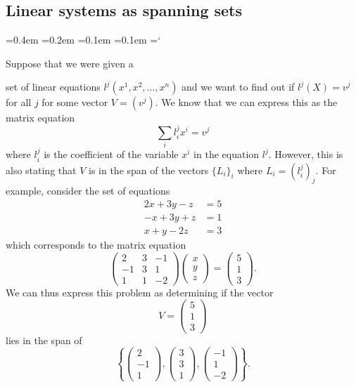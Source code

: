 
\subsection*{Linear systems as spanning sets}

{\ttfamily
{}\font=0.4em
\font=0.2em
\font=0.1em
\font=0.1em
\hyphenchar\font=`\-

\hypertarget{scripts_subspaces_and_spanning_sets_example}{Suppose that we were given a} set of linear equations $l^j(x^1, x^2, \dotsc, x^n)$ and we want to find out if $l^j(X) = v^j$ for all $j$ for some vector $V = (v^j)$. We know that we can express this as the matrix equation
\[
\sum_i l^j_i x^i = v^j
\]
where $l^j_i$ is the coefficient of the variable $x^i$ in the equation $l^j$. However, this is also stating that $V$ is in the span of the vectors $\{ L_i \}_i$ where $L_i = (l^j_i)_j$. For example, consider the set of equations
\begin{align*}
2 x + 3 y - z & = 5
\\ -x + 3y + z & = 1
\\ x + y - 2 z & = 3
\end{align*}
which corresponds to the matrix equation
\[
\begin{pmatrix}
2 & 3 & -1 \\
-1 & 3 & 1 \\
1 & 1 & -2
\end{pmatrix} \begin{pmatrix} x \\ y \\ z \end{pmatrix} = \begin{pmatrix} 5 \\ 1 \\ 3 \end{pmatrix}.
\]
We can thus express this problem as determining if the vector
\[
V = \begin{pmatrix} 5 \\ 1 \\ 3 \end{pmatrix}
\]
lies in the span of
\[
\left\{ \begin{pmatrix} 2 \\ -1 \\ 1 \end{pmatrix}, \begin{pmatrix} 3 \\ 3 \\ 1 \end{pmatrix}, \begin{pmatrix} -1 \\ 1 \\ -2 \end{pmatrix} \right\}.
\]

} %

